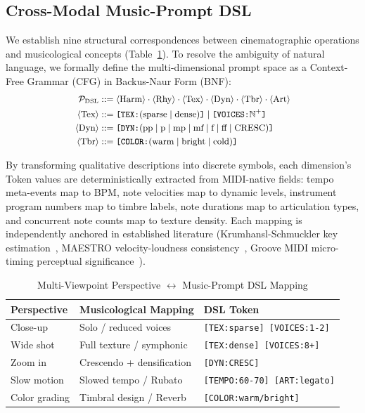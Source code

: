 \documentclass[conference]{IEEEtran}
\begin{document}
\subsection{Cross-Modal Music-Prompt DSL}

We establish nine structural correspondences between cinematographic operations and musicological concepts (Table~\ref{tab:mapping}). To resolve the ambiguity of natural language, we formally define the multi-dimensional prompt space as a Context-Free Grammar (CFG) in Backus-Naur Form (BNF):
\begin{equation}\small
\begin{aligned}
\mathcal{P}_{\text{DSL}} &::= \langle\text{Harm}\rangle \cdot \langle\text{Rhy}\rangle \cdot \langle\text{Tex}\rangle \cdot \langle\text{Dyn}\rangle \cdot \langle\text{Tbr}\rangle \cdot \langle\text{Art}\rangle \\
\langle\text{Tex}\rangle &::= \texttt{[TEX:} (\text{sparse} \mid \text{dense}) \texttt{]} \mid \texttt{[VOICES:} \mathbb{N}^+ \texttt{]} \\
\langle\text{Dyn}\rangle &::= \texttt{[DYN:} (\text{pp} \mid \text{p} \mid \text{mp} \mid \text{mf} \mid \text{f} \mid \text{ff} \mid \text{CRESC}) \texttt{]} \\
\langle\text{Tbr}\rangle &::= \texttt{[COLOR:} (\text{warm} \mid \text{bright} \mid \text{cold}) \texttt{]}
\end{aligned}
\end{equation}

By transforming qualitative descriptions into discrete symbols, each dimension's Token values are deterministically extracted from MIDI-native fields: tempo meta-events map to BPM, note velocities map to dynamic levels, instrument program numbers map to timbre labels, note durations map to articulation types, and concurrent note counts map to texture density. Each mapping is independently anchored in established literature (Krumhansl-Schmuckler key estimation~\cite{krumhansl}, MAESTRO velocity-loudness consistency~\cite{maestro}, Groove MIDI micro-timing perceptual significance~\cite{groove}).

\begin{table}[t]
\centering
\caption{Multi-Viewpoint Perspective $\leftrightarrow$ Music-Prompt DSL Mapping}
\label{tab:mapping}
\begin{tabularx}{\columnwidth}{@{}l >{\raggedright\arraybackslash}X >{\raggedright\arraybackslash}X@{}}
\toprule
\textbf{Perspective} & \textbf{Musicological Mapping} & \textbf{DSL Token} \\
\midrule
Close-up & Solo / reduced voices & \texttt{[TEX:sparse] [VOICES:1-2]} \\
Wide shot & Full texture / symphonic & \texttt{[TEX:dense] [VOICES:8+]} \\
Zoom in & Crescendo + densification & \texttt{[DYN:CRESC]} \\
Slow motion & Slowed tempo / Rubato & \texttt{[TEMPO:60-70] [ART:legato]} \\
Color grading & Timbral design / Reverb & \texttt{[COLOR:warm/bright]} \\
\bottomrule
\end{tabularx}
\end{table}
\end{document}
